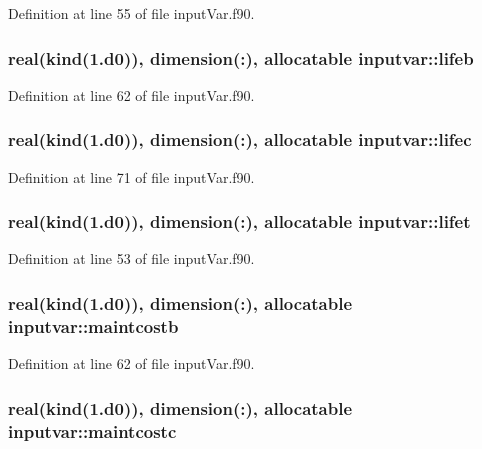 Definition at line 55 of file input\-Var.\-f90.

\hypertarget{classinputvar_abb62812e265fa305f173457cd4679829}{
\subsubsection[{lifeb}]{\setlength{\rightskip}{0pt plus 5cm}real(kind(1.d0)), dimension(\-:), allocatable inputvar\-::lifeb}}\label{classinputvar_abb62812e265fa305f173457cd4679829}


Definition at line 62 of file input\-Var.\-f90.

\hypertarget{classinputvar_aa699a72930e1393e056fa83bd5d68df5}{
\subsubsection[{lifec}]{\setlength{\rightskip}{0pt plus 5cm}real(kind(1.d0)), dimension(\-:), allocatable inputvar\-::lifec}}\label{classinputvar_aa699a72930e1393e056fa83bd5d68df5}


Definition at line 71 of file input\-Var.\-f90.

\hypertarget{classinputvar_ae41d245ccd35c2cc156a128bd2ecfb3c}{
\subsubsection[{lifet}]{\setlength{\rightskip}{0pt plus 5cm}real(kind(1.d0)), dimension(\-:), allocatable inputvar\-::lifet}}\label{classinputvar_ae41d245ccd35c2cc156a128bd2ecfb3c}


Definition at line 53 of file input\-Var.\-f90.

\hypertarget{classinputvar_a7af239451cf6d5494b2dec7d873ffa53}{
\subsubsection[{maintcostb}]{\setlength{\rightskip}{0pt plus 5cm}real(kind(1.d0)), dimension(\-:), allocatable inputvar\-::maintcostb}}\label{classinputvar_a7af239451cf6d5494b2dec7d873ffa53}


Definition at line 62 of file input\-Var.\-f90.

\hypertarget{classinputvar_adfa59ffad19dbf455b4964e32c3659d8}{
\subsubsection[{maintcostc}]{\setlength{\rightskip}{0pt plus 5cm}real(kind(1.d0)), dimension(\-:), allocatable inputvar\-::maintcostc}}\label{classinputvar_adfa59ffad19dbf455b4964e32c3659d8}


